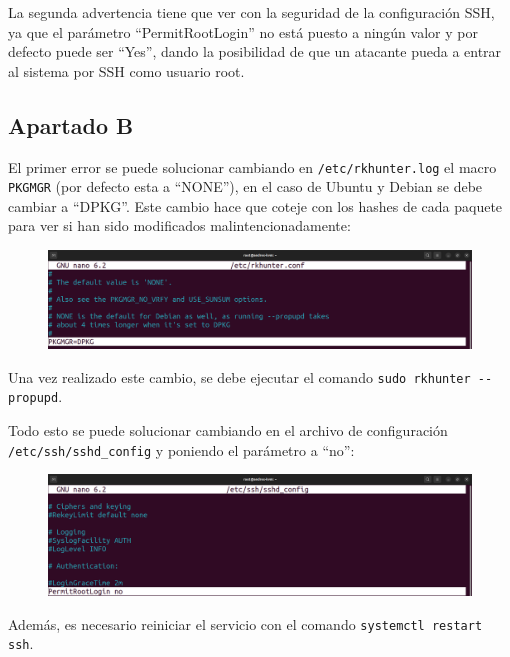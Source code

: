 \documentclass{article}
\begin{document}
\bigskip

La segunda advertencia tiene que ver con la seguridad de la configuración SSH, ya que el parámetro ``PermitRootLogin'' no está puesto a ningún valor y por defecto puede ser ``Yes'', dando la posibilidad de que un atacante pueda a entrar al sistema por SSH como usuario root.

\newpage

\subsection*{Apartado B}
El primer error se puede solucionar cambiando en \verb|/etc/rkhunter.log| el macro \verb|PKGMGR| (por defecto esta a ``NONE''), en el caso de Ubuntu y Debian se debe cambiar a ``DPKG''. Este cambio hace que coteje con los hashes de cada paquete para ver si han sido modificados malintencionadamente:

\begin{figure}[H]
    \includegraphics[width=\textwidth]{imagenes/rkhuntermacrodpkg.png}
\end{figure}

Una vez realizado este cambio, se debe ejecutar el comando \verb|sudo rkhunter --propupd|.


Todo esto se puede solucionar cambiando en el archivo de configuración \verb|/etc/ssh/sshd_config| y poniendo el parámetro a ``no'':

\begin{figure}[H]
    \includegraphics[width=\textwidth]{imagenes/sshpermit.png}
\end{figure}

Además, es necesario reiniciar el servicio con el comando \verb|systemctl restart ssh|.
\end{document}
